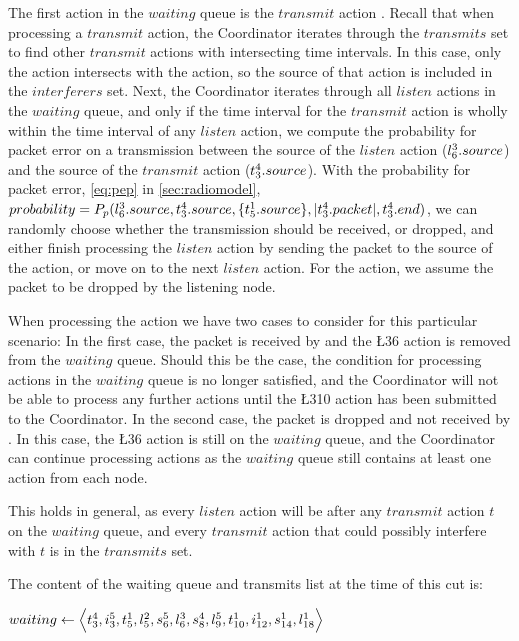 The first action in the $waiting$ queue is the $transmit$ action . Recall that when processing a $transmit$ action, the Coordinator iterates through the $transmits$ set to find other $transmit$ actions with intersecting time intervals. In this case, only the  action intersects with the  action, so the source of that action is included in the $interferers$ set. Next, the Coordinator iterates through all $listen$ actions in the $waiting$ queue, and only if the time interval for the $transmit$ action is wholly within the time interval of any $listen$ action, we compute the probability for packet error on a transmission between the source of the $listen$ action ($l^{3}_{6}.source$) and the source of the $transmit$ action ($t^{4}_{3}.source$). With the probability for packet error, \autoref{eq:pep} in \autoref{sec:radiomodel}, $probability = P_p(l^{3}_{6}.source, t^{4}_{3}.source, \{ t^{1}_{5}.source \}, |t^{4}_{3}.packet|, t^{4}_{3}.end)$, we can randomly choose whether the transmission should be received, or dropped, and either finish processing the $listen$ action by sending the packet to the source of the action, or move on to the next $listen$ action. For the  action, we assume the packet to be dropped by the listening node. \medbreak

When processing the  action we have two cases to consider for this particular scenario: In the first case, the packet is received by  and the \L{3}{6} action is removed from the $waiting$ queue. Should this be the case, the condition for processing actions in the $waiting$ queue is no longer satisfied, and the Coordinator will not be able to process any further actions until the \L{3}{10} action has been submitted to the Coordinator. In the second case, the packet is dropped and not received by . In this case, the \L{3}{6} action is still on the $waiting$ queue, and the Coordinator can continue processing actions as the $waiting$ queue still contains at least one action from each node. \medbreak

This holds in general, as every $listen$ action will be after any $transmit$ action $t$ on the $waiting$ queue, and every $transmit$ action that could possibly interfere with $t$ is in the $transmits$ set. \medbreak

The content of the waiting queue and transmits list at the time of this cut is: \smallbreak

$waiting \leftarrow \Big\langle%
    \T{4}{3}, %
    \I{5}{3}, %
    \T{1}{5}, %
    \L{2}{5}, %
    \S{5}{6}, %
    \L{3}{6}, %
    \S{4}{8}, %
    \L{5}{9}, %
    \T{1}{10}, %
    \I{1}{12}, %
    \S{1}{14}, %
    \L{1}{18} %
    \Big\rangle$

